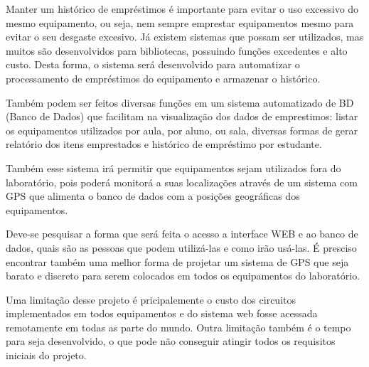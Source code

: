 Manter um histórico de empréstimos é importante para evitar o uso excessivo do mesmo equipamento, ou seja, nem sempre emprestar equipamentos mesmo para evitar o seu desgaste excesivo. Já existem sistemas que possam ser utilizados, mas muitos são desenvolvidos para bibliotecas, possuindo funções excedentes e alto custo. Desta forma, o sistema será desenvolvido para automatizar o processamento de empréstimos do equipamento e armazenar o histórico. 

Também podem ser feitos diversas funções em um sistema automatizado de BD (Banco de Dados) que facilitam na visualização dos dados de emprestimos: listar os equipamentos utilizados por aula, por aluno, ou sala, diversas formas de gerar relatório dos itens emprestados e histórico de empréstimo por estudante.

Também esse sistema irá permitir que equipamentos sejam utilizados fora do laboratório, pois poderá monitorá a suas localizações através de um sistema com GPS que alimenta o banco de dados com a posições geográficas dos equipamentos.

Deve-se pesquisar a forma que será feita o acesso a interface WEB e ao banco de dados, quais são as pessoas que podem utilizá-las e como irão usá-las. É presciso encontrar também uma melhor forma de projetar um sistema de GPS que seja barato e discreto para serem colocados em todos os equipamentos do laboratório.

Uma limitação desse projeto é pricipalemente o custo dos circuitos implementados em todos equipamentos e do sistema web fosse acessada remotamente em todas as parte do mundo. Outra limitação também é o tempo para seja desenvolvido, o que pode não conseguir atingir todos os requisitos iniciais do projeto.